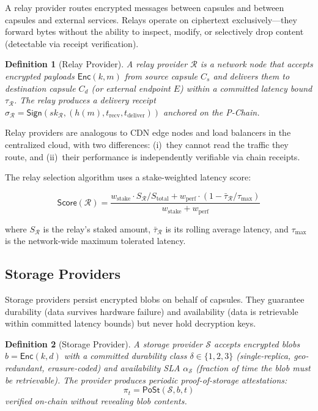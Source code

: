 \documentclass[11pt,a4paper]{article}
\newtheorem{definition}{Definition}
\begin{document}
A relay provider routes encrypted messages between capsules and between capsules
and external services. Relays operate on ciphertext exclusively---they forward
bytes without the ability to inspect, modify, or selectively drop content
(detectable via receipt verification).

\begin{definition}[Relay Provider]
A relay provider $\mathcal{R}$ is a network node that accepts encrypted payloads
$\mathsf{Enc}(k, m)$ from source capsule $C_s$ and delivers them to destination
capsule $C_d$ (or external endpoint $E$) within a committed latency bound
$\tau_{\mathcal{R}}$. The relay produces a delivery receipt
$\sigma_{\mathcal{R}} = \mathsf{Sign}(sk_{\mathcal{R}}, (h(m), t_{\text{recv}}, t_{\text{deliver}}))$
anchored on the P-Chain.
\end{definition}

Relay providers are analogous to CDN edge nodes and load balancers in the
centralized cloud, with two differences: (i)~they cannot read the traffic
they route, and (ii)~their performance is independently verifiable via
chain receipts.

The relay selection algorithm uses a stake-weighted latency score:

\begin{equation}\label{eq:relay-score}
    \mathsf{Score}(\mathcal{R}) = \frac{w_{\text{stake}} \cdot S_{\mathcal{R}} / S_{\text{total}} + w_{\text{perf}} \cdot (1 - \bar{\tau}_{\mathcal{R}} / \tau_{\max})}{w_{\text{stake}} + w_{\text{perf}}}
\end{equation}

where $S_{\mathcal{R}}$ is the relay's staked amount, $\bar{\tau}_{\mathcal{R}}$
is its rolling average latency, and $\tau_{\max}$ is the network-wide maximum
tolerated latency.

\subsection{Storage Providers}

Storage providers persist encrypted blobs on behalf of capsules. They guarantee
durability (data survives hardware failure) and availability (data is retrievable
within committed latency bounds) but never hold decryption keys.

\begin{definition}[Storage Provider]
A storage provider $\mathcal{S}$ accepts encrypted blobs $b = \mathsf{Enc}(k, d)$
with a committed durability class $\delta \in \{1, 2, 3\}$ (single-replica,
geo-redundant, erasure-coded) and availability SLA $\alpha_{\mathcal{S}}$
(fraction of time the blob must be retrievable). The provider produces
periodic proof-of-storage attestations:
\begin{equation}
    \pi_t = \mathsf{PoSt}(\mathcal{S}, b, t)
\end{equation}
verified on-chain without revealing blob contents.
\end{definition}
\end{document}
